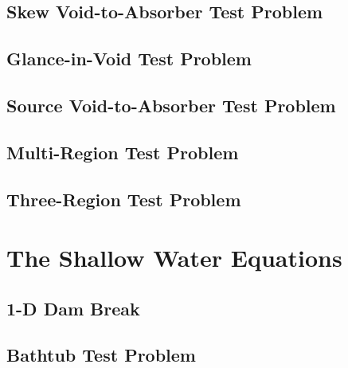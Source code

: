 \subsection{Skew Void-to-Absorber Test Problem\label{sec:skew_void_to_absorber}}
  
\subsection{Glance-in-Void Test Problem\label{sec:glance_in_void}}
  
\subsection{Source Void-to-Absorber Test Problem\label{sec:source_void_to_absorber}}
  
\subsection{Multi-Region Test Problem\label{sec:multi_region}}
  
\subsection{Three-Region Test Problem\label{sec:three_region}}
  
\section{The Shallow Water Equations\label{sec:shallow_water_results}}
\subsection{1-D Dam Break\label{sec:dam_break_1d}}
  
\subsection{Bathtub Test Problem\label{sec:bathtub}}
  
